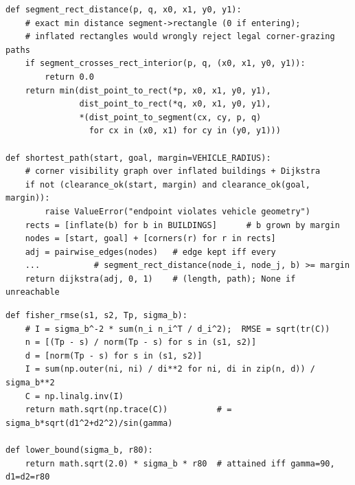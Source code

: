 \begin{lstlisting}[caption={Exact disc-clearance for a travel segment and the
visibility-graph router (AI-assisted implementation).},label={lst:path}]
def segment_rect_distance(p, q, x0, x1, y0, y1):
    # exact min distance segment->rectangle (0 if entering);
    # inflated rectangles would wrongly reject legal corner-grazing paths
    if segment_crosses_rect_interior(p, q, (x0, x1, y0, y1)):
        return 0.0
    return min(dist_point_to_rect(*p, x0, x1, y0, y1),
               dist_point_to_rect(*q, x0, x1, y0, y1),
               *(dist_point_to_segment(cx, cy, p, q)
                 for cx in (x0, x1) for cy in (y0, y1)))

def shortest_path(start, goal, margin=VEHICLE_RADIUS):
    # corner visibility graph over inflated buildings + Dijkstra
    if not (clearance_ok(start, margin) and clearance_ok(goal, margin)):
        raise ValueError("endpoint violates vehicle geometry")
    rects = [inflate(b) for b in BUILDINGS]      # b grown by margin
    nodes = [start, goal] + [corners(r) for r in rects]
    adj = pairwise_edges(nodes)   # edge kept iff every
    ...           # segment_rect_distance(node_i, node_j, b) >= margin
    return dijkstra(adj, 0, 1)    # (length, path); None if unreachable
\end{lstlisting}

\begin{lstlisting}[caption={Q2(1): Fisher information, RMSE closed form and
attainable lower bound (derivation by the team, implementation AI-assisted).},
label={lst:fisher}]
def fisher_rmse(s1, s2, Tp, sigma_b):
    # I = sigma_b^-2 * sum(n_i n_i^T / d_i^2);  RMSE = sqrt(tr(C))
    n = [(Tp - s) / norm(Tp - s) for s in (s1, s2)]
    d = [norm(Tp - s) for s in (s1, s2)]
    I = sum(np.outer(ni, ni) / di**2 for ni, di in zip(n, d)) / sigma_b**2
    C = np.linalg.inv(I)
    return math.sqrt(np.trace(C))          # = sigma_b*sqrt(d1^2+d2^2)/sin(gamma)

def lower_bound(sigma_b, r80):
    return math.sqrt(2.0) * sigma_b * r80  # attained iff gamma=90, d1=d2=r80
\end{lstlisting}

